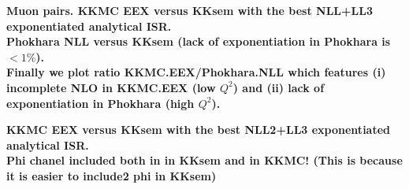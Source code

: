 \documentclass[dvips]{seminar}                      %
\begin{document}
\begin{slide}
\vspace{-3mm}
\begin{center}
\end{center}
\vspace{-2mm}
{\footnotesize\bf
  Muon pairs.
  {\cgr KKMC EEX} versus KKsem with the best NLL+LL3 exponentiated analytical ISR.\\
  {\crd Phokhara NLL} versus KKsem 
  (lack of exponentiation in Phokhara is $<1\%$).\\
  Finally we plot ratio {\cmg KKMC.EEX/Phokhara.NLL} which
  features (i) incomplete NLO in KKMC.EEX (low $Q^2$)
  and (ii) lack of exponentiation in Phokhara (high $Q^2$).
}
\vfill
\end{slide}    %


\begin{slide}
\vspace{-3mm}
\begin{center}
\end{center}
\vspace{-2mm}
{\footnotesize\bf
  KKMC {\crd EEX} versus KKsem with the best NLL2+LL3 exponentiated analytical ISR.\\
  Phi chanel included both in in KKsem and in KKMC!
  (This is because it is easier to include2 phi in KKsem)
}
\vfill
\end{slide}    %
\end{document}
